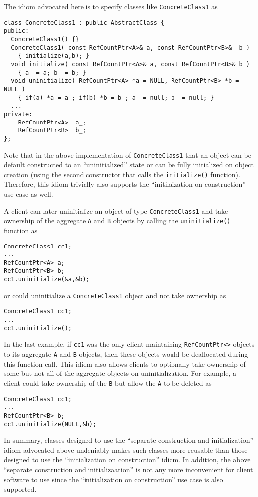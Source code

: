 The idiom advocated here is to specify classes like
{}\texttt{ConcreteClass1} as
%
{\scriptsize\begin{verbatim}
class ConcreteClass1 : public AbstractClass {
public:
  ConcreteClass1() {}
  ConcreteClass1( const RefCountPtr<A>& a, const RefCountPtr<B>&  b )
    { initialize(a,b); }
  void initialize( const RefCountPtr<A>& a, const RefCountPtr<B>& b )
    { a_ = a; b_ = b; }
  void uninitialize( RefCountPtr<A> *a = NULL, RefCountPtr<B> *b = NULL )
    { if(a) *a = a_; if(b) *b = b_; a_ = null; b_ = null; }
  ...
private:
    RefCountPtr<A>  a_;
    RefCountPtr<B>  b_;
};
\end{verbatim}}

Note that in the above implementation of {}\texttt{ConcreteClass1}
that an object can be default constructed to an ``uninitialized''
state or can be fully initialized on object creation (using the second
constructor that calls the {}\texttt{initialize()} function).
Therefore, this idiom trivially also supports the ``initilaization on
construction'' use case as well.

A client can later uninitialize an object of type
{}\texttt{Concrete\-Class1} and take ownership of the aggregate
{}\texttt{A} and {}\texttt{B} objects by calling the
{}\texttt{uninitialize()} function as

{\scriptsize\begin{verbatim}
ConcreteClass1 cc1;
...
RefCountPtr<A> a;
RefCountPtr<B> b;
cc1.uninitialize(&a,&b);
\end{verbatim}}

{}\noindent{}or could uninitialize a {}\texttt{Concrete\-Class1}
object and not take ownership as

{\scriptsize\begin{verbatim}
ConcreteClass1 cc1;
...
cc1.uninitialize();
\end{verbatim}}

{}\noindent{}In the last example, if {}\texttt{cc1} was the only
client maintaining {}\texttt{RefCountPtr<>} objects to its aggregate
{}\texttt{A} and {}\texttt{B} objects, then these objects would be
deallocated during this function call.  This idiom also allows clients
to optionally take ownership of some but not all of the aggregate
objects on uninitialization.  For example, a client could take
ownership of the {}\texttt{B} but allow the {}\texttt{A} to be deleted
as

{\scriptsize\begin{verbatim}
ConcreteClass1 cc1;
...
RefCountPtr<B> b;
cc1.uninitialize(NULL,&b);
\end{verbatim}}

In summary, classes designed to use the ``separate construction and
initialization'' idiom advocated above undeniably makes such classes
more reusable than those designed to use the ``initialization on
construction'' idiom.  In addition, the above ``separate construction
and initializaation'' is not any more inconvenient for client software
to use since the ``initialization on construction'' use case is also
supported.
